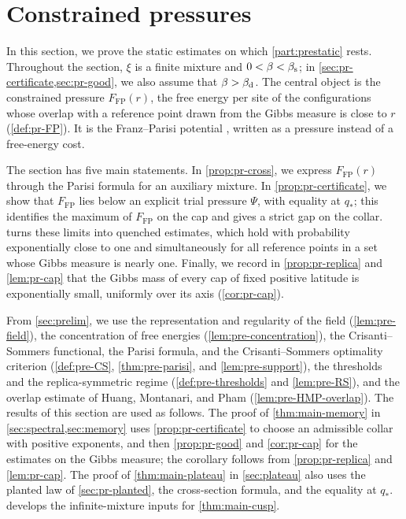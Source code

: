 \chapter{Constrained pressures}\label{sec:pressure}

In this section, we prove the static estimates on which \cref{part:prestatic} rests. Throughout the section, $\xi$ is a finite mixture and $0<\beta<\beta_{\mathrm s}$; in \cref{sec:pr-certificate,sec:pr-good}, we also assume that $\beta>\beta_{\mathrm d}$. The central object is the constrained pressure $F_{\mathrm{FP}}(r)$, the free energy per site of the configurations whose overlap with a reference point drawn from the Gibbs measure is close to $r$ (\cref{def:pr-FP}). It is the Franz--Parisi potential \cite{FranzParisi1995}, written as a pressure instead of a free-energy cost.

The section has five main statements. In \cref{prop:pr-cross}, we express $F_{\mathrm{FP}}(r)$ through the Parisi formula for an auxiliary mixture. In \cref{prop:pr-certificate}, we show that $F_{\mathrm{FP}}$ lies below an explicit trial pressure $\Psi$, with equality at $q_*$; this identifies the maximum of $F_{\mathrm{FP}}$ on the cap and gives a strict gap on the collar.  turns these limits into quenched estimates, which hold with probability exponentially close to one and simultaneously for all reference points in a set whose Gibbs measure is nearly one. Finally, we record in \cref{prop:pr-replica} and \cref{lem:pr-cap} that the Gibbs mass of every cap of fixed positive latitude is exponentially small, uniformly over its axis (\cref{cor:pr-cap}).

From \cref{sec:prelim}, we use the representation and regularity of the field (\cref{lem:pre-field}), the concentration of free energies (\cref{lem:pre-concentration}), the Crisanti--Sommers functional, the Parisi formula, and the Crisanti--Sommers optimality criterion (\cref{def:pre-CS}, \cref{thm:pre-parisi}, and \cref{lem:pre-support}), the thresholds and the replica-symmetric regime (\cref{def:pre-thresholds} and \cref{lem:pre-RS}), and the overlap estimate of Huang, Montanari, and Pham (\cref{lem:pre-HMP-overlap}). The results of this section are used as follows. The proof of \cref{thm:main-memory} in \cref{sec:spectral,sec:memory} uses \cref{prop:pr-certificate} to choose an admissible collar with positive exponents, and then \cref{prop:pr-good} and \cref{cor:pr-cap} for the estimates on the Gibbs measure; the corollary follows from \cref{prop:pr-replica} and \cref{lem:pr-cap}. The proof of \cref{thm:main-plateau} in \cref{sec:plateau} also uses the planted law of \cref{sec:pr-planted}, the cross-section formula, and the equality at $q_*$.  develops the infinite-mixture inputs for \cref{thm:main-cusp}.

